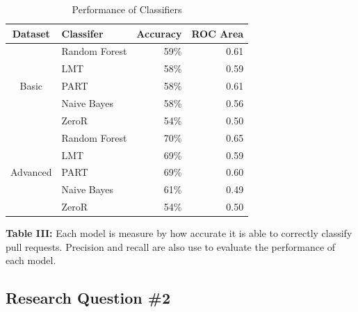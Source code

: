 \documentclass[10pt, conference]{IEEEtran}
\begin{document}
\begin{table}[h!]
  \centering
  \caption{Performance of Classifiers}
  \label{figureClassifers}
  \begin{tabular}{c|lrr}
    \hline
    \textbf {Dataset} & \textbf{Classifer} & \textbf{Accuracy} & \textbf{ROC Area}\\
    \hline
    \multirow{5}{*}{Basic}
    				& \multicolumn{1}{l}{Random Forest} & \multicolumn{1}{r}{59\%} & \multicolumn{1}{r}{0.61} \\\cline{2-4}
                                 & \multicolumn{1}{l}{LMT} & \multicolumn{1}{r}{58\%} & \multicolumn{1}{r}{0.59} \\\cline{2-4}
                                 & \multicolumn{1}{l}{PART} & \multicolumn{1}{r}{58\%} & \multicolumn{1}{r}{0.61} \\\cline{2-4}
                                 & \multicolumn{1}{l}{Naive Bayes} & \multicolumn{1}{r}{58\%} & \multicolumn{1}{r}{0.56} \\\cline{2-4}
                                 & \multicolumn{1}{l}{ZeroR} & \multicolumn{1}{r}{54\%} & \multicolumn{1}{r}{0.50} \\\hline
    \multirow{5}{*}{Advanced} 
    				& \multicolumn{1}{l}{Random Forest} & \multicolumn{1}{r}{70\%} & \multicolumn{1}{r}{0.65} \\\cline{2-4}
                                 & \multicolumn{1}{l}{LMT} & \multicolumn{1}{r}{69\%} & \multicolumn{1}{r}{0.59} \\\cline{2-4}
                                 & \multicolumn{1}{l}{PART} & \multicolumn{1}{r}{69\%} & \multicolumn{1}{r}{0.60} \\\cline{2-4}
                                 & \multicolumn{1}{l}{Naive Bayes} & \multicolumn{1}{r}{61\%} & \multicolumn{1}{r}{0.49} \\\cline{2-4}
                                 & \multicolumn{1}{l}{ZeroR} & \multicolumn{1}{r}{54\%} & \multicolumn{1}{r}{0.50} \\\hline
  \end{tabular}
  \break
  \break
\textbf{Table III:} Each model is measure by how accurate it is able to correctly classify pull requests. Precision and recall are also use to evaluate the performance of each model.
\end{table}

\hfill

\subsection{Research Question \#2}
\end{document}
